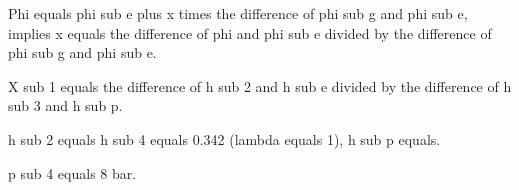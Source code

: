 Phi equals phi sub e plus x times the difference of phi sub g and phi sub e, implies x equals the difference of phi and phi sub e divided by the difference of phi sub g and phi sub e.

X sub 1 equals the difference of h sub 2 and h sub e divided by the difference of h sub 3 and h sub p.

h sub 2 equals h sub 4 equals 0.342 (lambda equals 1), h sub p equals.

p sub 4 equals 8 bar.